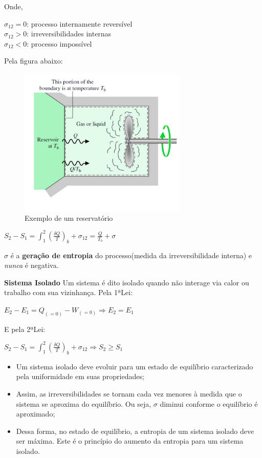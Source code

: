 \documentclass[a4paper, 12pt]{article}
\begin{document}
Onde,
	\begin{flushleft}
		$ \sigma_{12} = 0$: processo internamente reversível\\
		$ \sigma_{12} > 0$: irreversibilidades internas\\
		$ \sigma_{12} < 0$: processo impossível
	\end{flushleft}
	
Pela figura abaixo:

	\begin{figure}[h]
		\includegraphics[width = 8cm]{aa.png}
		\centering
		\caption{Exemplo de um reservatório}
	\end{figure}	

	\begin{center}
		\large
		$ S_2 - S_1 = \int^2_1(\frac{\delta Q}{T})_b + \sigma_{12} = \frac{Q}{T_b} + \sigma $
	\end{center}

$ \sigma  $ é a \textbf{geração de entropia} do processo(medida da irreversibilidade interna) e \textit{nunca} é negativa.

\textbf{Sistema Isolado}
Um sistema é dito isolado quando não interage via calor ou trabalho com sua vizinhança. Pela 1ªLei:
	\begin{center}
		\large
		$ E_2 - E_1 = Q_{(=0)} - W_{(=0)} \Rightarrow E_2 = E_ 1$
	\end{center}
E pela 2ªLei:
	\begin{center}
		\large
		$ S_2 - S_1 = \int^2_1(\frac{\delta Q}{T})_b + \sigma_{12} \Rightarrow S_2\geq S_1$
	\end{center}

\begin{itemize}
	\item Um sistema isolado deve evoluir para um estado de equilíbrio caracterizado pela uniformidade em suas propriedades;
	\item Assim, as irreversibilidades se tornam cada vez menores à medida que o sistema se aproxima do equilíbrio. Ou seja, $ \sigma $ diminui conforme o equilíbrio é aproximado;
	\item Dessa forma, no estado de equilíbrio, a entropia de um sistema isolado deve ser máxima. Este é o princípio do aumento da entropia para um sistema isolado.
\end{itemize}
\end{document}
